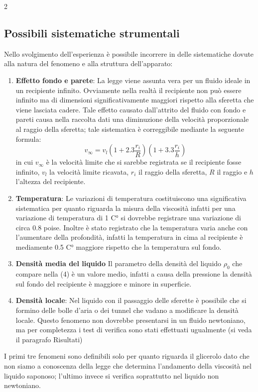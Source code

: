 \documentclass{article}
\begin{document}
\begin{multicols}{2}
\subsection{Possibili sistematiche strumentali}
Nello svolgimento dell'esperienza è possibile incorrere in delle sistematiche dovute alla natura del fenomeno e alla struttura dell'apparato:
\begin{enumerate}
    \item \textbf{Effetto fondo e parete}: La legge viene assunta vera per un fluido ideale in un recipiente infinito. Ovviamente nella realtà il recipiente non può essere infinito ma di dimensioni significativamente maggiori rispetto alla sferetta che viene lasciata cadere. Tale effetto causato dall'attrito del fluido con fondo e pareti causa nella raccolta dati una diminuzione della velocità proporzionale al raggio della sferetta; tale sistematica è correggibile mediante la seguente formula:
    \begin{equation}
        v_{\infty}=v_l(1+2.3\frac{r_i}{R})(1+3.3\frac{r_i}{h})
    \end{equation}
    in cui $v_{\infty}$ è la velocità limite che si sarebbe registrata se il recipiente fosse infinito, $v_l$ la velocità limite ricavata, $r_i$ il raggio della sferetta, $R$ il raggio e $h$ l'altezza del recipiente.
    \item \textbf{Temperatura}: Le variazioni di temperatura costituiscono una significativa sistematica per quanto riguarda la misura della viscosità infatti per una variazione di temperatura di 1 C° si dovrebbe registrare una variazione di circa 0.8 poise. Inoltre è stato registrato che la temperatura varia anche con l'aumentare della profondità, infatti la temperatura in cima al recipiente è mediamente 0.5 C° maggiore rispetto che la temperatura sul fondo.
    \item \textbf{Densità media del liquido} Il parametro della densità del liquido $\rho_0$ che compare nella (4) è un valore medio, infatti a causa della pressione la densità sul fondo del recipiente è maggiore e minore in superficie.
    \item \textbf{Densità locale}: Nel liquido con il passaggio delle sferette è possibile che si formino delle bolle d'aria o dei tunnel che vadano a modificare la densità locale. Questo fenomeno non dovrebbe presentarsi in un fluido newtoniano, ma per completezza i test di verifica sono stati effettuati ugualmente (si veda il paragrafo Risultati)
\end{enumerate}
I primi tre fenomeni sono definibili solo per quanto riguarda il glicerolo dato che non siamo a conoscenza della legge che determina l'andamento della viscosità nel liquido saponoso; l'ultimo invece si verifica soprattutto nel liquido non newtoniano.



\end{multicols}
\end{document}
